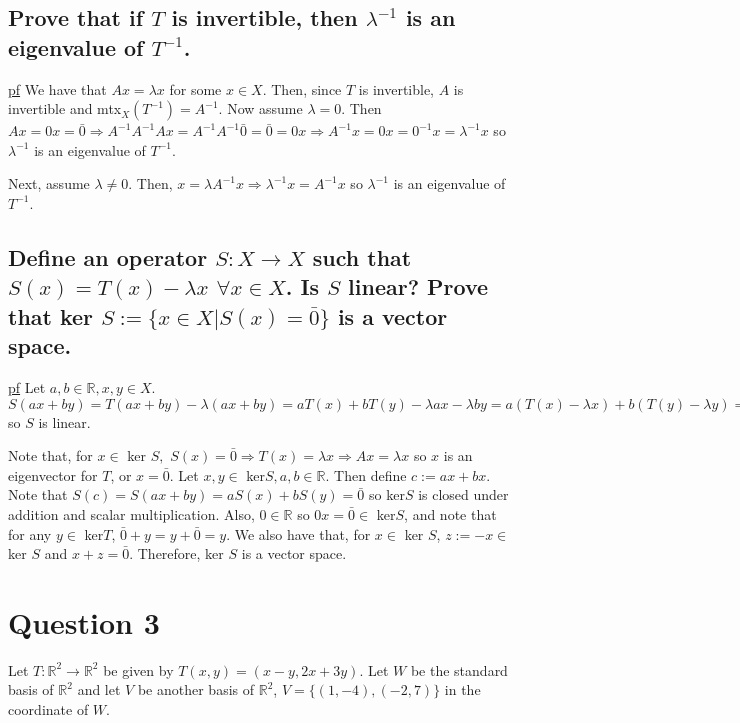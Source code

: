\documentclass[11pt]{article} %
\begin{document}
\subsection{Prove that if $T$ is invertible, then $\lambda^{-1}$ is an eigenvalue of $T^{-1}$.}
\underline{pf} We have that $Ax = \lambda x$ for some $x \in X$. Then, since $T$ is invertible, $A$ is invertible and mtx$_X(T^{-1}) = A^{-1}.$ Now assume $\lambda = 0$. Then $Ax = 0x = \bar{0} \Rightarrow A^{-1} A^{-1} A x = A^{-1} A^{-1} \bar{0} = \bar{0} = 0x \Rightarrow A^{-1}x = 0 x = 0^{-1} x = \lambda^{-1} x$ so $\lambda^{-1}$ is an eigenvalue of $T^{-1}.$ 

Next, assume $\lambda \neq 0.$ Then, $x = \lambda A^{-1}x \Rightarrow \lambda^{-1} x = A^{-1}x$ so $\lambda^{-1}$ is an eigenvalue of $T^{-1}$.

\subsection{Define an operator $S: X \rightarrow X$ such that $S(x) = T(x) - \lambda x$ $\forall x \in X$. Is $S$ linear? Prove that ker $S:= \{ x \in X | S(x) = \bar{0}\}$ is a vector space.}
\underline{pf} Let $a,b \in \mathbb{R}, x,y \in X.$ $S(ax + by) = T(ax + by) - \lambda(ax+by) = aT(x) + bT(y) - \lambda a x - \lambda b y = a(T(x) - \lambda x) + b(T(y) - \lambda y) = aS(x) + bS(y)$ so $S$ is linear.

Note that, for $x \in $ ker $S,$ $S(x) = \bar{0} \Rightarrow T(x) = \lambda x \Rightarrow Ax = \lambda x$ so $x$ is an eigenvector for $T$, or $x = \bar{0}$. Let $x,y \in $ ker$S, a,b \in \mathbb{R}.$ Then define $c:= ax +bx.$ Note that $S(c) = S(ax+by) = aS(x)+bS(y) = \bar{0}$ so ker$S$ is closed under addition and scalar multiplication. Also, $0 \in \mathbb{R}$ so $0x = \bar{0} \in$ ker$S$, and note that for any $y \in $ ker$T$, $\bar{0} + y = y+\bar{0} = y.$  We also have that, for $x \in $ ker $S$, $z := -x \in $ ker $S$ and $x+z = \bar{0}.$ Therefore, ker $S$ is a vector space.


\section{Question 3}
Let $T: \mathbb{R}^2 \rightarrow \mathbb{R}^2$ be given by $T(x,y) = (x-y,2x+3y).$ Let $W$ be the standard basis of $\mathbb{R}^2$ and let $V$ be another basis of $\mathbb{R}^2$, $V = \{(1,-4),(-2,7) \}$ in the coordinate of $W$.
\end{document}
